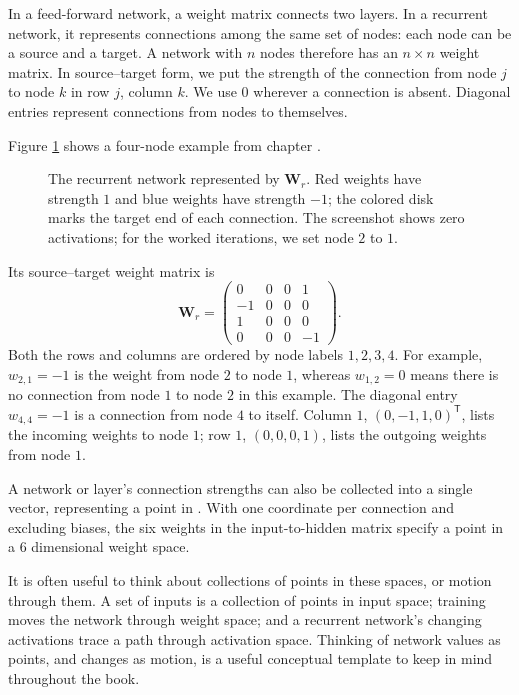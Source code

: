 In a feed-forward network, a weight matrix connects two layers. In a recurrent network, it represents connections among the same set of nodes: each node can be a source and a target. A network with $n$ nodes therefore has an $n\times n$ weight matrix. In source--target form, we put the strength of the connection from node $j$ to node $k$ in row $j$, column $k$. We use $0$ wherever a connection is absent. Diagonal entries represent connections from nodes to themselves.

Figure \ref{abridged_sparse_recurrent} shows a four-node example from chapter .

\begin{figure}[!ht]
\centering
{}
\caption[Jeff Yoshimi.]{The recurrent network represented by $\mathbf{W}_r$. Red weights have strength $1$ and blue weights have strength $-1$; the colored disk marks the target end of each connection. The screenshot shows zero activations; for the worked iterations, we set node $2$ to $1$.}
\label{abridged_sparse_recurrent}
\end{figure}

Its source--target weight matrix is
\[
\mathbf{W}_r=
\begin{pmatrix}
0&0&0&1\\
-1&0&0&0\\
1&0&0&0\\
0&0&0&-1
\end{pmatrix}.
\]
Both the rows and columns are ordered by node labels $1,2,3,4$. For example, $w_{2,1}=-1$ is the weight from node $2$ to node $1$, whereas $w_{1,2}=0$ means there is no connection from node $1$ to node $2$ in this example. The diagonal entry $w_{4,4}=-1$ is a connection from node $4$ to itself. Column $1$, $(0,-1,1,0)^{\mathsf{T}}$, lists the incoming weights to node $1$; row $1$, $(0,0,0,1)$, lists the outgoing weights from node $1$.

A network or layer's connection strengths can also be collected into a single vector, representing a point in . With one coordinate per connection and excluding biases, the six weights in the input-to-hidden matrix specify a point in a 6 dimensional weight space. 

It is often useful to think about collections of points in these spaces, or motion through them. A set of inputs is a collection of points in input space; training moves the network through weight space; and a recurrent network's changing activations trace a path through activation space. Thinking of network values as points, and changes as motion, is a useful conceptual template to keep in mind throughout the book.

